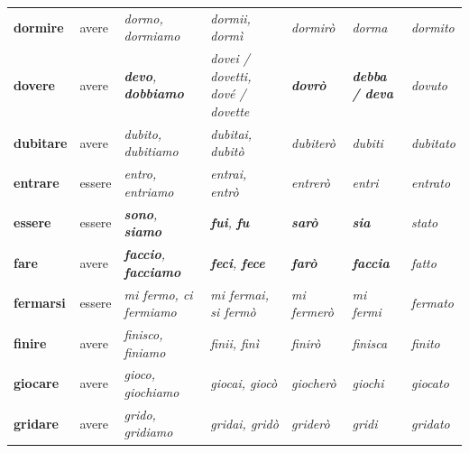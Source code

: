 \documentclass[11pt,a4paper,twoside,openright]{book}
\newcommand{\irr}[1]{{\color{exccol}\bfseries #1}}
\begin{document}
{\begin{xltabular}{\linewidth}{@{}>{\raggedright\arraybackslash}p{2.7cm} l L L l >{\raggedright\arraybackslash}p{1.9cm} l@{}}
\textbf{dormire} & avere & \textit{dormo, dormiamo} & \textit{dormii, dormì} & \textit{dormirò} & \textit{dorma} & \textit{dormito} \\
\textbf{dovere} & avere & \textit{\irr{devo}, \irr{dobbiamo}} & \textit{dovei / dovetti, dové / dovette} & \textit{\irr{dovrò}} & \textit{\irr{debba / deva}} & \textit{dovuto} \\
\textbf{dubitare} & avere & \textit{dubito, dubitiamo} & \textit{dubitai, dubitò} & \textit{dubiterò} & \textit{dubiti} & \textit{dubitato} \\
\textbf{entrare} & essere & \textit{entro, entriamo} & \textit{entrai, entrò} & \textit{entrerò} & \textit{entri} & \textit{entrato} \\
\textbf{essere} & essere & \textit{\irr{sono}, \irr{siamo}} & \textit{\irr{fui}, \irr{fu}} & \textit{\irr{sarò}} & \textit{\irr{sia}} & \textit{stato} \\
\textbf{fare} & avere & \textit{\irr{faccio}, \irr{facciamo}} & \textit{\irr{feci}, \irr{fece}} & \textit{\irr{farò}} & \textit{\irr{faccia}} & \textit{fatto} \\
\textbf{fermarsi} & essere & \textit{mi fermo, ci fermiamo} & \textit{mi fermai, si fermò} & \textit{mi fermerò} & \textit{mi fermi} & \textit{fermato} \\
\textbf{finire} & avere & \textit{finisco, finiamo} & \textit{finii, finì} & \textit{finirò} & \textit{finisca} & \textit{finito} \\
\textbf{giocare} & avere & \textit{gioco, giochiamo} & \textit{giocai, giocò} & \textit{giocherò} & \textit{giochi} & \textit{giocato} \\
\textbf{gridare} & avere & \textit{grido, gridiamo} & \textit{gridai, gridò} & \textit{griderò} & \textit{gridi} & \textit{gridato} \\

\end{xltabular}}
\end{document}
